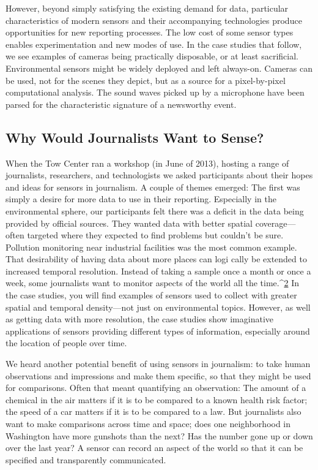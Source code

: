 However, beyond simply satisfying the existing demand for data, particular
characteristics of modern sensors and their accompanying technologies
produce opportunities for new reporting processes. The low cost of some
sensor types enables experimentation and new modes of use. In the case
studies that follow, we see examples of cameras being practically disposable,
or at least sacrificial. Environmental sensors might be widely deployed and
left always-on. Cameras can be used, not for the scenes they depict, but as a
source for a pixel-by-pixel computational analysis. The sound waves picked
up by a microphone have been parsed for the characteristic signature of a
newsworthy event.

\subsection{Why Would Journalists Want to Sense?}
When the Tow Center ran a workshop (in June of 2013), hosting a range of
journalists, researchers, and technologists we asked participants about their
hopes and ideas for sensors in journalism. A couple of themes emerged: The
first was simply a desire for more data to use in their reporting. Especially in
the environmental sphere, our participants felt there was a deficit in the
data being provided by official sources. They wanted data with better spatial
coverage—often targeted where they expected to find problems but couldn't
be sure. Pollution monitoring near industrial facilities was the most common
example. That desirability of having data about more places can logi
cally be extended to increased temporal resolution. Instead of taking a
sample once a month or once a week, some journalists want to monitor
aspects of the world all the time.^{\href{#endnotes-landscape}{2}} In the case studies, you will find examples
of sensors used to collect with greater spatial and temporal density—not
just on environmental topics. However, as well as getting data with more
resolution, the case studies show imaginative applications of sensors providing
different types of information, especially around the location of
people over time.

We heard another potential benefit of using sensors in journalism: to take
human observations and impressions and make them specific, so that they
might be used for comparisons. Often that meant quantifying an observation:
The amount of a chemical in the air matters if it is to be compared
to a known health risk factor; the speed of a car matters if it is to be compared
to a law. But journalists also want to make comparisons across time
and space; does one neighborhood in Washington have more gunshots
than the next? Has the number gone up or down over the last year? A
sensor can record an aspect of the world so that it can be specified and
transparently communicated.


